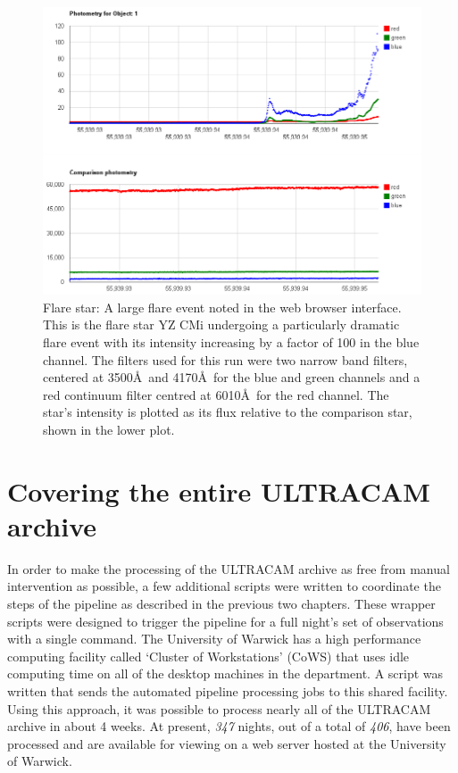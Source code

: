 \begin{figure}
\centering
\includegraphics[width=150mm]{images/ultraflare-on-YZCMi.png}
\caption{Flare star: A large flare event noted in the web browser interface. This is the flare star YZ CMi undergoing a particularly dramatic flare event with its intensity increasing by a factor of 100 in the blue channel. The filters used for this run were two narrow band filters, centered at 3500\AA\  and 4170\AA\  for the blue and green channels and a red continuum filter centred at 6010\AA\  for the red channel. The star's intensity is plotted as its flux relative to the comparison star, shown in the lower plot. }
\label{fig:ultraflare-web}
\end{figure}


\section{Covering the entire ULTRACAM archive}
In order to make the processing of the ULTRACAM archive as free from manual intervention as possible, a few additional scripts were written to coordinate the steps of the pipeline as described in the previous two chapters. These wrapper scripts were designed to trigger the pipeline for a full night's set of observations with a single command. The University of Warwick has a high performance computing facility called `Cluster of Workstations' (CoWS) that uses idle computing time on all of the desktop machines in the department. A script was written that sends the automated pipeline processing jobs to this shared facility. Using this approach, it was possible to process nearly all of the ULTRACAM archive in about 4 weeks. At present, \emph{347} nights, out of a total of \emph{406}, have been processed and are available for viewing on a web server hosted at the University of Warwick. 

